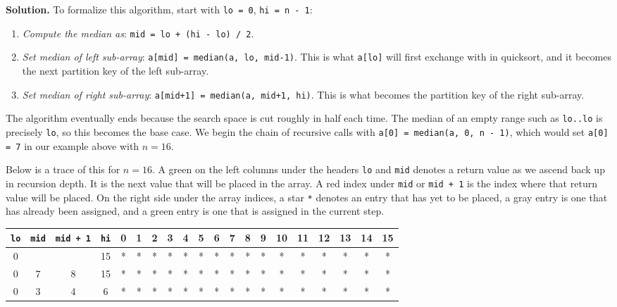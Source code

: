 \documentclass[12pt, a4paper]{article}
\newenvironment{sol}[1][Solution]
{\par\medskip\noindent \textbf{#1.} }
{\medskip}
\begin{document}
\begin{sol}
		To formalize this algorithm, start with \texttt{lo = 0}, \texttt{hi = n - 1}:
		\begin{enumerate}[label=(\roman*)]
			\item \emph{Compute the median as}: \texttt{mid = lo + (hi - lo) / 2}.
			
			\item \emph{Set median of left sub-array}: \texttt{a[mid] = median(a, lo, mid-1)}.
				This is what \texttt{a[lo]} will first exchange with in quicksort,
				and it becomes the next partition key of the left sub-array.
				
			\item \emph{Set median of right sub-array}: \texttt{a[mid+1] = median(a, mid+1, hi)}.
			This is what becomes the partition key of the right sub-array.
		\end{enumerate}
		The algorithm eventually ends because the search space is cut roughly in half
		each time. The median of an empty range such as \texttt{lo..lo} is precisely
		\texttt{lo}, so this becomes the base case. We begin the chain of recursive
		calls with \texttt{a[0] = \texttt{median(a, 0, n - 1)}}, which would set
		\texttt{a[0] = 7} in our example above with $n=16$.
		
		Below is a trace of this for $n=16$. A green on the left columns under
		the headers \texttt{lo} and \texttt{mid} denotes a return value
		as we ascend back up in recursion depth. It is the next value that
		will be placed in the array. A red index under \texttt{mid} or
		\texttt{mid + 1} is the index where that return value will be placed.
		On the right side under the array indices, a star \texttt{*} denotes
		an entry that has yet to be placed, a gray entry is one that has already
		been assigned, and a green entry is one that is assigned in the current step.
		\begin{center}
			\begin{tabular}{cccc|cccccccccccccccc}
				\texttt{lo} & \texttt{mid} & \texttt{mid + 1} & \texttt{hi} &
				0 & 1 & 2 & 3 & 4 & 5 & 6 & 7 & 8 & 9 & 10 & 11 & 12 & 13 & 14 & 15\\
				\hline
				
				0 & {} & {} & 15 &
				* & * & * & * & * & * & * & * & * & * & * & * & * & * & * & * \\
				
				0 & 7 & 8 & 15 &
				* & * & * & * & * & * & * & * & * & * & * & * & * & * & * & * \\
				
				0 & 3 & 4 & 6 &
				* & * & * & * & * & * & * & * & * & * & * & * & * & * & * & * \\
				

\end{tabular}
\end{center}
\end{sol}
\end{document}
